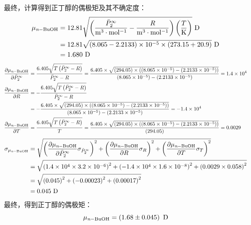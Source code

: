 \documentclass[cn,hazy,pku,12pt,normal,math=newtx,cite=super]{elegantnote}
\begin{document}
最终，计算得到正丁醇的偶极矩及其不确定度：
\begin{equation}\label{eq:7}
    \begin{aligned}
    \mu_{\ce{\textit{n}-BuOH}} &= 12.81\sqrt{\left(\frac{\bar{P}_2^\infty}{\mathrm{m^3\cdot mol^{-1}}}-\frac{R}{\mathrm{m^3\cdot mol^{-1}}}\right)\left(\frac{T}{\mathrm{K}}\right)} \mathrm{~D} \\
    &= 12.81\sqrt{(8.065-2.2133) \times 10^{-5}\times(273.15+20.9)} \mathrm{~D}\\
    &= 1.680 \mathrm{~D}
\end{aligned}
\end{equation}
\begin{equation*}
\begin{aligned}
\frac{\partial \mu_{\ce{\textit{n}-BuOH}} }{\partial \bar{P}_2^\infty }&=\frac{6.405 \sqrt{T \left(\bar{P}_2^\infty - R\right)}}{\bar{P}_2^\infty - R}=\frac{6.405 \times \sqrt{\left(294.05\right) \times \left(\left(8.065 \times 10^{-5}\right) - \left(2.2133 \times 10^{-5}\right)\right)}}{\left(8.065 \times 10^{-5}\right) - \left(2.2133 \times 10^{-5}\right)}=1.4 \times 10^{4}\\
\frac{\partial \mu_{\ce{\textit{n}-BuOH}} }{\partial R }&=- \frac{6.405 \sqrt{T \left(\bar{P}_2^\infty - R\right)}}{\bar{P}_2^\infty - R}\\
&=- \frac{6.405 \times \sqrt{\left(294.05\right) \times \left(\left(8.065 \times 10^{-5}\right) - \left(2.2133 \times 10^{-5}\right)\right)}}{\left(8.065 \times 10^{-5}\right) - \left(2.2133 \times 10^{-5}\right)}=-1.4 \times 10^{4}\\
\frac{\partial \mu_{\ce{\textit{n}-BuOH}} }{\partial T }&=\frac{6.405 \sqrt{T \left(\bar{P}_2^\infty - R\right)}}{T}=\frac{6.405 \times \sqrt{\left(294.05\right) \times \left(\left(8.065 \times 10^{-5}\right) - \left(2.2133 \times 10^{-5}\right)\right)}}{\left(294.05\right)}=0.0029\\
\end{aligned}
\end{equation*}
\begin{equation*}
\begin{aligned}
\sigma_{\mu_{\ce{\textit{n}-BuOH}}}&=\sqrt{\left(\frac{\partial \mu_{\ce{\textit{n}-BuOH}} }{\partial \bar{P}_2^\infty } \sigma_{\bar{P}_2^\infty}\right)^2+\left(\frac{\partial \mu_{\ce{\textit{n}-BuOH}} }{\partial R } \sigma_{R}\right)^2+\left(\frac{\partial \mu_{\ce{\textit{n}-BuOH}} }{\partial T } \sigma_{T}\right)^2}\\
&=\sqrt{\left(1.4 \times 10^{4} \times 3.2 \times 10^{-6}\right)^2+\left(-1.4 \times 10^{4} \times 1.6 \times 10^{-8}\right)^2+\left(0.0029 \times 0.058\right)^2}\\
&=\sqrt{\left(0.045\right)^2+\left(-0.00023\right)^2+\left(0.00017\right)^2}\\
&=0.045\mathrm{~D}
\end{aligned}
\end{equation*}
最终，得到正丁醇的偶极矩：
\begin{equation*}
\mu_{\ce{\textit{n}-BuOH}}=\left (1.68 \pm 0.045 \right )\mathrm{~D} 
\end{equation*}
\end{document}
